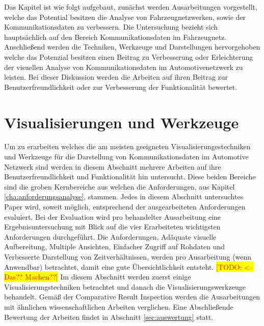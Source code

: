 \documentclass[draft=false
              ,paper=a4
              ,twoside=false
              ,fontsize=11pt
              ,headsepline
              ,BCOR10mm
              ,DIV11
              ]{scrbook}
\newcommand{\TODO}[1]{\colorbox{yellow}{\textcolor{red}{[TODO: #1]}}}
\begin{document}
Das Kapitel ist wie folgt aufgebaut, zunächst werden Ausarbeitungen vorgestellt, welche das Potential besitzen die Analyse von Fahrzeugnetzwerken, sowie der Kommunikationsdaten zu verbessern. Die Untersuchung bezieht sich hauptsächlich auf den Bereich Kommunikationsdaten im Fahrzeugnetz. Anschließend werden die Techniken, Werkzeuge und Darstellungen hervorgehoben welche das Potenzial besitzen einen Beitrag zu Verbesserung oder Erleichterung der visuellen Analyse von Kommunikationsdaten im Automotivenetzwerk zu leisten. Bei dieser Diskussion werden die Arbeiten auf ihren Beitrag zur Benutzerfreundlichkeit oder zur Verbesserung der Funktionalität bewertet. 



\section{Visualisierungen und Werkzeuge} %
\label{sec:visualisierungen_und_werkzeuge}
Um zu erarbeiten welches die am meisten geeigneten Visualisierungestechniken und Werkzeuge für die Darstellung von Kommunikationsdaten im Automotive Netzwerk sind werden in diesem Abschnitt mehrere Arbeiten auf ihre Benutzerfreundlichkeit und Funktionalität hin untersucht. Diese beiden Bereiche sind die groben Kernbereiche aus welchen die Anforderungen, aus Kapitel \ref{cha:anforderungsanalyse}, stammen. Jedes in diesem Abschnitt untersuchtes Paper wird, soweit möglich, entsprechend der ausgearbeiteten Anforderungen evaluiert. Bei der Evaluation wird pro behandelter Ausarbeitung eine Ergebnisuntersuchung mit Blick auf die vier Erarbeiteten wichtigsten Anforderungen durchgeführt. Die Anforderungen, Adäquate visuelle Aufbereitung, Multiple Ansichten, Einfacher Zugriff auf Rohdaten und Verbesserte Darstellung von Zeitverhältnissen, werden pro Ausarbeitung (wenn Anwendbar) betrachtet, damit eine gute Übersichtlichkeit entsteht. \TODO{<-- Das?? Machen??}
Im diesem Abschnitt werden zuerst einige Visualisierungstechniken betrachtet und danach die Visualisierungswerkzeuge behandelt. Gemäß der Comparative Result Inspection werden die Ausarbeitungen mit ähnlichen wissenschaftlichen Arbeiten verglichen. Eine Abschließende Bewertung der Arbeiten findet in Abschnitt \ref{sec:auswertung} statt.
\end{document}
